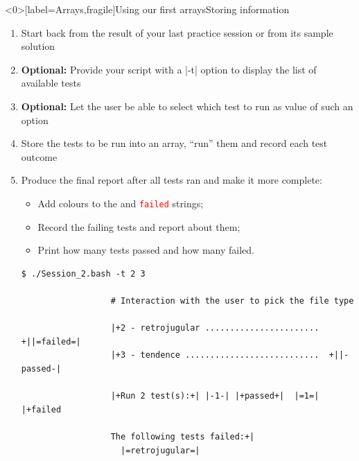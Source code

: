 \begin{frame}<0>[label=Arrays,fragile]{Using our first arrays}{Storing information}
    \vspace{-2mm}
    \begin{enumerate}
        \item Start back from the result of your last practice session or from its sample solution
        \item \textbf{Optional:} Provide your script with a \bash|-t| option to display the list of available tests
        \item \textbf{Optional:} Let the user be able to select which test to run as value of such an option
        \item Store the tests to be run into an array, ``run'' them and record each test outcome
        \item Produce the final report after all tests ran and make it more complete:
              \begin{itemize}
                  \item Add colours to the  and \textcolor{red}{\texttt{failed}} strings;
                  \item Record the failing tests and report about them;
                  \item Print how many tests passed and how many failed.
              \end{itemize}
              \begin{lstlisting}[style=MyBash, numbers=none, aboveskip=3mm, belowskip=-5mm, style=smaller, xleftmargin=2mm, xrightmargin=10mm, moredelim={[is][\color{comment-color}]{|=}{=|}}]
                  $ ./Session_2.bash -t 2 3

                  # Interaction with the user to pick the file type

                  |+2 - retrojugular .......................  +||=failed=|
                  |+3 - tendence ...........................  +||-passed-|

                  |+Run 2 test(s):+| |-1-| |+passed+|  |=1=| |+failed

                  The following tests failed:+|
                    |=retrojugular=|
              \end{lstlisting}
    \end{enumerate}
\end{frame}
